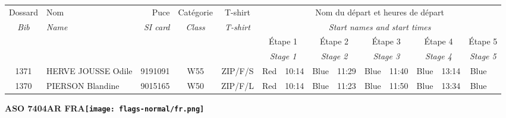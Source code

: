\documentclass{report}
\begin{document}
  \begin{longtable}{|c|l|r|c|c|*{5}{cc|}}
    Dossard & Nom  & Puce    & Catégorie & T-shirt & \multicolumn{10}{c|}{Nom du départ et heures de départ} \\
    \itshape Bib     & \itshape Name & \itshape SI card & \itshape Class  & \itshape  T-shirt  & \multicolumn{10}{c|}{\itshape Start names and start times} \\
    \hline
    & & & & & \multicolumn{2}{c|}{Étape 1} & \multicolumn{2}{c|}{Étape 2} & \multicolumn{2}{c|}{Étape 3} & \multicolumn{2}{c|}{Étape 4} & \multicolumn{2}{c|}{Étape 5} \\
    & & & & & \multicolumn{2}{c|}{\itshape Stage 1} & \multicolumn{2}{c|}{\itshape Stage 2} & \multicolumn{2}{c|}{\itshape Stage 3} & \multicolumn{2}{c|}{\itshape Stage 4} & \multicolumn{2}{c|}{\itshape Stage 5} \\
    \hline
    1371 & HERVE JOUSSE Odile & 9191091 & W55 & ZIP/F/S & Red & 10:14 & Blue & 11:29 & Blue & 11:40 & Blue & 13:14 & Blue &  \\
    1370 & PIERSON Blandine & 9015165 & W50 & ZIP/F/L & Red & 10:14 & Blue & 11:23 & Blue & 11:50 & Blue & 13:34 & Blue &  \\
  \end{longtable}
\newpage
  \Huge \centering \bfseries ASO 7404AR FRA\normalfont \footnotesize \sffamily \hfill \texttt{[image: flags-normal/fr.png]} \newline 
\end{document}
